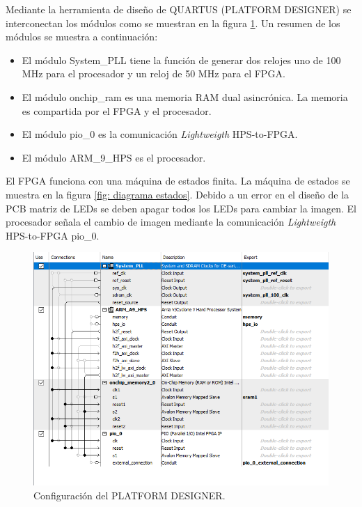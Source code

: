 Mediante la herramienta de diseño de QUARTUS (PLATFORM DESIGNER) \citep{PLATFORM} se interconectan los módulos como se muestran en la figura \ref{fig: platform}. Un resumen de los módulos se muestra a continuación:
\begin{itemize}
\item El módulo System\_PLL tiene la función de generar dos relojes uno de 100 MHz para el procesador y un reloj de 50 MHz para el FPGA.
\item El módulo onchip\_ram es una memoria RAM dual asincrónica. La memoria es compartida por el FPGA y el procesador. 
\item El módulo pio\_0 es la comunicación \textit{Lightweigth} HPS-to-FPGA. 
\item El módulo ARM\_9\_HPS es el procesador. 
\end{itemize}

El FPGA funciona con una máquina de estados finita. La máquina de estados se muestra en la figura \ref{fig: diagrama estados}. Debido a un error en el diseño de la PCB matriz de LEDs se deben apagar todos los LEDs para cambiar la imagen. El procesador señala el cambio de imagen mediante la comunicación \textit{Lightweigth} HPS-to-FPGA pio\_0.

 



\begin{figure}[htpb]
	\centering
	\includegraphics[scale=0.8]{Figures/platformdesigner.png} 
	\caption{Configuración del PLATFORM DESIGNER.}
	\label{fig: platform}
\end{figure}



